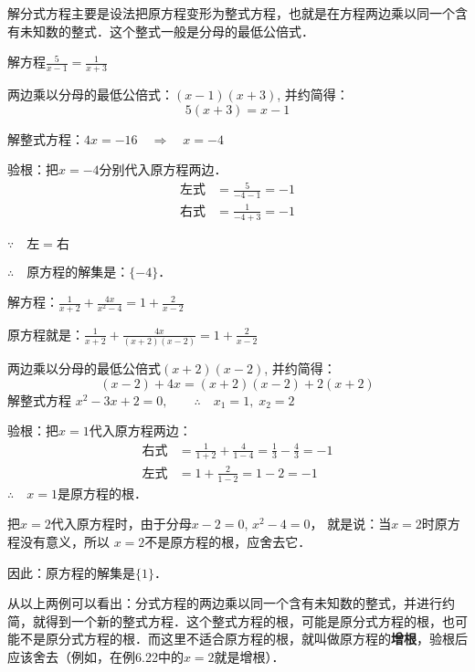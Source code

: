 解分式方程主要是设法把原方程变形为整式方程，也就是在方程两边乘以同一个含有未知数的整式．这个整式一般是分母的最低公倍式．



\begin{example}
 解方程$\frac{5}{x-1}=\frac{1}{x+3}$  
\end{example}

\begin{solution}
两边乘以分母的最低公倍式：$(x-1)(x+3)$, 并约简得：
\[5(x+3)=x-1\]

解整式方程：$4x=-16\quad \Rightarrow\quad x=-4$

验根：把$x=-4$分别代入原方程两边．
\[\begin{split}
    \text{左式}&=\frac{5}{-4-1}=-1\\
    \text{右式}&=\frac{1}{-4+3}=-1  
\end{split}\]

$\because\quad \text{左}=\text{右}$

$\therefore\quad $原方程的解集是：$\{-4\}$．
\end{solution}


\begin{example}
解方程：$\frac{1}{x+2}+\frac{4x}{x^2-4}=1+\frac{2}{x-2}$
\end{example}

\begin{solution}
    原方程就是：$\frac{1}{x+2}+\frac{4x}{(x+2)(x-2)}=1+\frac{2}{x-2}$

    两边乘以分母的最低公倍式$(x+2)(x-2)$, 并约简得：
    \[(x-2)+4x=(x+2)(x-2)+2(x+2)\]
    解整式方程 $x^2-3x+2=0,\qquad \therefore\quad x_1=1,\;x_2=2$
    
    验根：把$x=1$代入原方程两边：
    \[\begin{split}
        \text{右式}&=\frac{1}{1+2}+\frac{4}{1-4}=\frac{1}{3}-\frac{4}{3}=-1\\
        \text{左式}&=1+\frac{2}{1-2}=1-2=-1
    \end{split}\]
    $\therefore\quad x=1$是原方程的根．

    把$x=2$代入原方程时，由于分母$x-2=0$, $x^2-4=0$，
    就是说：当$x=2$时原方程没有意义，所以 $x=2$不是原方程的根，应舍去它．

因此：原方程的解集是$\{1\}$．
\end{solution}

从以上两例可以看出：分式方程的两边乘以同一个含有未知数的整式，并进行约简，就得到一个新的整式方程．这个整式方程的根，可能是原分式方程的根，也可能不是原分式方程的根．而这里不适合原方程的根，就叫做原方程的\textbf{增根}，验根后应该舍去（例如，在例6.22中的$x=2$就是增根）．

